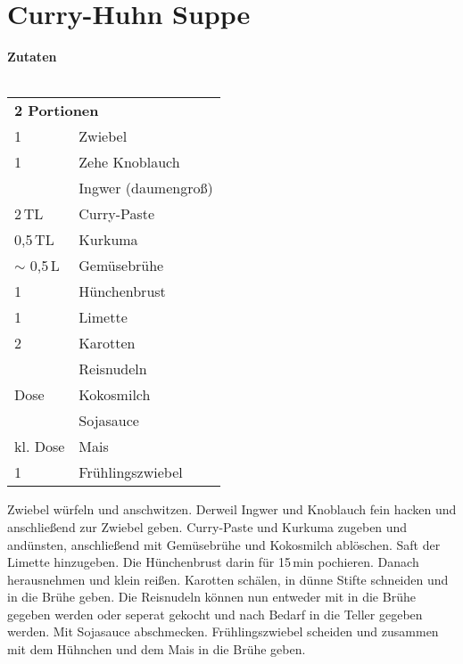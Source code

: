 \section*{Curry-Huhn Suppe}
\vspace{2cm}
\begingroup
	\parfillskip=0pt
\begin{minipage}[t][][t]{0.33\linewidth}
{{\large \textbf{Zutaten}}}\\\\
\begin{tabular}{ll}
	\multicolumn{2}{l}{\textbf{2 Portionen}}\\
1&Zwiebel\\
1&Zehe Knoblauch\\
&Ingwer (daumengroß)\\
2\,TL&Curry-Paste\\
0,5\,TL&Kurkuma\\
$\sim$ 0,5\,L&Gemüsebrühe\\
1&Hünchenbrust\\
1& Limette\\
2&Karotten\\
&Reisnudeln\\
Dose&Kokosmilch\\
&Sojasauce\\
kl. Dose&Mais\\
1&Frühlingszwiebel\\
\end{tabular}
\end{minipage}
\hfill
\begin{minipage}[t][][t]{0.66\linewidth}
Zwiebel würfeln und anschwitzen. Derweil Ingwer und Knoblauch fein hacken und anschließend zur Zwiebel geben. Curry-Paste und Kurkuma zugeben und andünsten, anschließend mit Gemüsebrühe und Kokosmilch ablöschen. Saft der Limette hinzugeben. Die Hünchenbrust darin für 15\,min pochieren. Danach herausnehmen und klein reißen. Karotten schälen, in dünne Stifte schneiden und in die Brühe geben. Die Reisnudeln können nun entweder mit in die Brühe gegeben werden oder seperat gekocht und nach Bedarf in die Teller gegeben werden. Mit Sojasauce abschmecken. Frühlingszwiebel scheiden und zusammen mit dem Hühnchen und dem Mais in die Brühe geben.
\end{minipage}
\clearpage